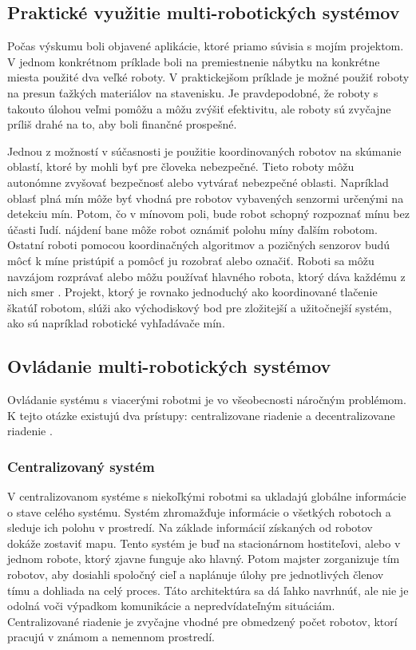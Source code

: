 \subsection{Praktické využitie multi-robotických systémov}

Počas výskumu boli objavené aplikácie, ktoré priamo súvisia s mojím projektom. V jednom konkrétnom príklade boli na
premiestnenie nábytku na konkrétne miesta použité dva veľké roboty. V praktickejšom príklade je možné použiť roboty na
presun ťažkých materiálov na stavenisku. Je pravdepodobné, že roboty s takouto úlohou veľmi pomôžu a môžu zvýšiť
efektivitu, ale roboty sú zvyčajne príliš drahé na to, aby boli finančné prospešné.
\vspace{3mm}

\justifying
\noindent 
Jednou z možností v súčasnosti je použitie koordinovaných robotov na skúmanie oblastí, ktoré by mohli byť pre
človeka nebezpečné. Tieto roboty môžu autonómne zvyšovať bezpečnosť alebo vytvárať nebezpečné oblasti. Napríklad oblasť
plná mín môže byť vhodná pre robotov vybavených senzormi určenými na detekciu mín. Potom, čo v mínovom poli, bude robot schopný rozpoznať mínu bez účasti ľudí. nájdení bane môže robot oznámiť polohu míny ďalším robotom.
Ostatní roboti pomocou koordinačných algoritmov a pozičných senzorov budú môcť k míne pristúpiť a pomôcť ju rozobrať
alebo označiť. Roboti sa môžu navzájom rozprávať alebo môžu používať hlavného robota, ktorý dáva každému z nich smer
\citep{mclurkin}. Projekt, ktorý je rovnako jednoduchý ako koordinované tlačenie škatúľ robotom, slúži ako východiskový bod pre
zložitejší a užitočnejší systém, ako sú napríklad robotické vyhľadávače mín.

\subsection{Ovládanie multi-robotických systémov}
Ovládanie systému s viacerými robotmi je vo všeobecnosti náročným problémom. K tejto otázke existujú dva prístupy:
centralizovane riadenie a decentralizovane riadenie \citep{kexu}.

\subsubsection{Centralizovaný systém}
V centralizovanom systéme s niekoľkými robotmi sa ukladajú globálne informácie o stave celého systému. Systém
zhromažďuje informácie o všetkých robotoch a sleduje ich polohu v prostredí. Na základe informácií získaných od robotov
dokáže zostaviť mapu. Tento systém je buď na stacionárnom hostiteľovi, alebo v jednom robote, ktorý zjavne funguje ako
hlavný. Potom majster zorganizuje tím robotov, aby dosiahli spoločný cieľ a naplánuje úlohy pre jednotlivých členov tímu
a dohliada na celý proces.
Táto architektúra sa dá ľahko navrhnúť, ale nie je odolná voči výpadkom komunikácie a nepredvídateľným situáciám.
Centralizované riadenie je zvyčajne vhodné pre obmedzený počet robotov, ktorí pracujú v známom a nemennom prostredí.

